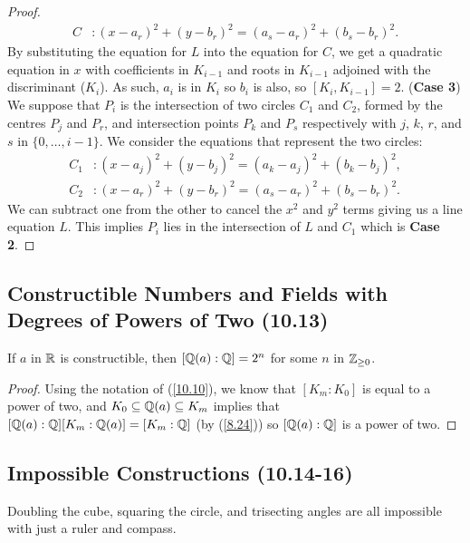 \begin{proof}
\begin{align*}
        C &: (x - a_r)^2 + (y - b_r)^2 = (a_s - a_r)^2 + (b_s - b_r)^2.
    \end{align*} By substituting the equation for $L$ into the equation for $C$, we
    get a quadratic equation in $x$ with coefficients in $K_{i - 1}$ and roots in
    $K_{i - 1}$ adjoined with the discriminant ($K_i$). As such, $a_i$ is in $K_i$
    so $b_i$ is also, so $[K_i, K_{i - 1}] = 2$.
    \bs
    (\textbf{Case 3}) We suppose that $P_i$ is the intersection of two circles $C_1$
    and $C_2$, formed by the centres $P_j$ and $P_r$, and intersection points
    $P_k$ and $P_s$ respectively with $j$, $k$, $r$, and $s$ in $\{0, \ldots, i - 1\}$.
    We consider the equations that represent the two circles: \begin{align*}
        C_1 &: (x - a_j)^2 + (y - b_j)^2 = (a_k - a_j)^2 + (b_k - b_j)^2, \\
        C_2 &: (x - a_r)^2 + (y - b_r)^2 = (a_s - a_r)^2 + (b_s - b_r)^2.
    \end{align*} We can subtract one from the other to cancel the $x^2$ and $y^2$ terms
    giving us a line equation $L$. This implies $P_i$ lies in the intersection of $L$
    and $C_1$ which is \textbf{Case 2}.
\end{proof}

\subsection{Constructible Numbers and Fields with Degrees of Powers of Two (10.13)} \label{10.13}

If $a$ in $\mathbb{R}$ is constructible, then $[\mathbb{Q}(a) : \mathbb{Q}] = 2^n$ for some
$n$ in $\mathbb{Z}_{\geq 0}$.

\begin{proof}
    Using the notation of (\ref{10.10}), we know that $[K_m : K_0]$ is equal to a power
    of two, and $K_0 \subseteq \mathbb{Q}(a) \subseteq K_m$ implies that
    $[\mathbb{Q}(a) : \mathbb{Q}][K_m : \mathbb{Q}(a)] = [K_m : \mathbb{Q}]$ (by (\ref{8.24})) so
    $[\mathbb{Q}(a) : \mathbb{Q}]$ is a power of two.
\end{proof}

\subsection{Impossible Constructions (10.14-16)} \label{10.14} \label{10.15} \label{10.16}

Doubling the cube, squaring the circle, and trisecting angles are all impossible with just a
ruler and compass.

